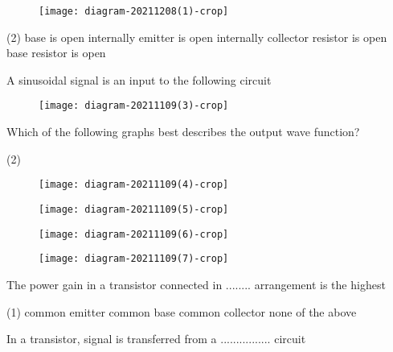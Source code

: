 \begin{enumerate}
\begin{minipage}{\textwidth}
\begin{figure}[H]
	\centering
	\texttt{[image: diagram-20211208(1)-crop]}
\end{figure}
\end{minipage}
\begin{tasks}(2)
	\task[\textbf{A.}]base is open internally 
	\task[\textbf{B.}] emitter is open internally
	\task[\textbf{C.}]collector resistor is open
	\task[\textbf{D.}]base resistor is open
\end{tasks}
\begin{minipage}{\textwidth}
	\item A sinusoidal signal is an input to the following circuit\\
\begin{figure}[H]
	\centering
	\texttt{[image: diagram-20211109(3)-crop]}
\end{figure}
	Which of the following graphs best describes the output wave function?
\end{minipage}
\begin{tasks}(2)
	\task[\textbf{A.}]\begin{figure}[H]
		\centering
		\texttt{[image: diagram-20211109(4)-crop]}
	\end{figure}
	\task[\textbf{B.}] \begin{figure}[H]
		\centering
		\texttt{[image: diagram-20211109(5)-crop]}
	\end{figure}
	\task[\textbf{C.}]\begin{figure}[H]
		\centering
		\texttt{[image: diagram-20211109(6)-crop]}
	\end{figure}
	\task[\textbf{D.}]\begin{figure}[H]
		\centering
		\texttt{[image: diagram-20211109(7)-crop]}
	\end{figure}
\end{tasks}
\begin{minipage}{\textwidth}
	\item  The power gain in a transistor connected in ........
	arrangement is the highest
\end{minipage}
\begin{tasks}(1)
	\task[\textbf{A.}]common emitter 
	\task[\textbf{B.}] common base
	\task[\textbf{C.}]common collector
	\task[\textbf{D.}]	none of the above
\end{tasks}
\begin{minipage}{\textwidth}
	\item  In a transistor, signal is transferred from a ................
	circuit
	    

\end{minipage}
\end{enumerate}
